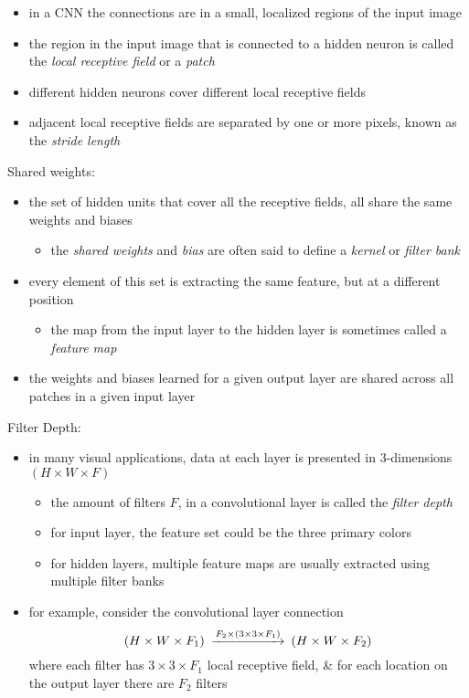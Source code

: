 \documentclass[onecolumn]{IEEEtran}
\newcommand{\beq}{\begin{equation}}
\newcommand{\eeq}{\end{equation}}
\newcommand{\bi}{\begin{itemize}}
\newcommand{\ei}{\end{itemize}}
\begin{document}
\begin{itemize}
        \item in a CNN the connections are in a small, localized regions of the input image
        \item the region in the input image that is connected to a hidden neuron is called the \emph{local receptive field} or a \emph{patch}
        \item different hidden neurons cover different local receptive fields
        \item adjacent local receptive fields are separated by one or more pixels, known as the \emph{stride length}
    \ei
    \item Shared weights:
    \bi
        \item the set of hidden units that cover all the receptive fields, all share the same weights and biases
        \bi
            \item the \emph{shared weights} and \emph{bias} are often said to define a \emph{kernel} or \emph{filter bank}
        \ei
        \item every element of this set is extracting the same feature, but at a different position
        \bi
            \item  the map from the input layer to the hidden layer is sometimes called a \emph{feature map}
        \ei
        \item the weights and biases learned for a given output layer are shared across all patches in a given input layer
    \ei
    \item Filter Depth:
    \bi
      \item in many visual applications, data at each layer is presented in $3$-dimensions $(H \times W \times F)$
      \bi
            \item the amount of filters $F$, in a convolutional layer is called the \emph{filter depth}
            \item for input layer, the feature set could be the three primary colors
            \item for hidden layers, multiple feature maps are usually extracted using multiple filter banks
      \ei
      \item for example, consider the convolutional layer connection
      \beq\label{filter_size}\begin{CD}
            (H \times W \times F_1) @>F_2 \times (3\times 3 \times F_1)>>  (H \times W \times F_2)
      \end{CD}\eeq
      where each filter has $3\times 3 \times F_1$ local receptive field, \& for each location on the output layer there are $F_2$ filters

\end{itemize}
\end{document}
